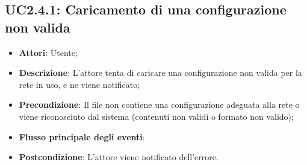 \subsection{UC2.4.1: Caricamento di una configurazione non valida}
\begin{itemize}
	\item \textbf{Attori}: Utente;
	\item \textbf{Descrizione}: L'attore tenta di caricare una configurazione non valida per la rete in uso, e ne viene notificato;
	\item \textbf{Precondizione}: Il file non contiene una configurazione adeguata alla rete o viene riconosciuto dal sistema (contenuti non validi o formato non valido);
	\item \textbf{Flusso principale degli eventi}:
	\item \textbf{Postcondizione}: L'attore viene notificato dell'errore.
\end{itemize}

